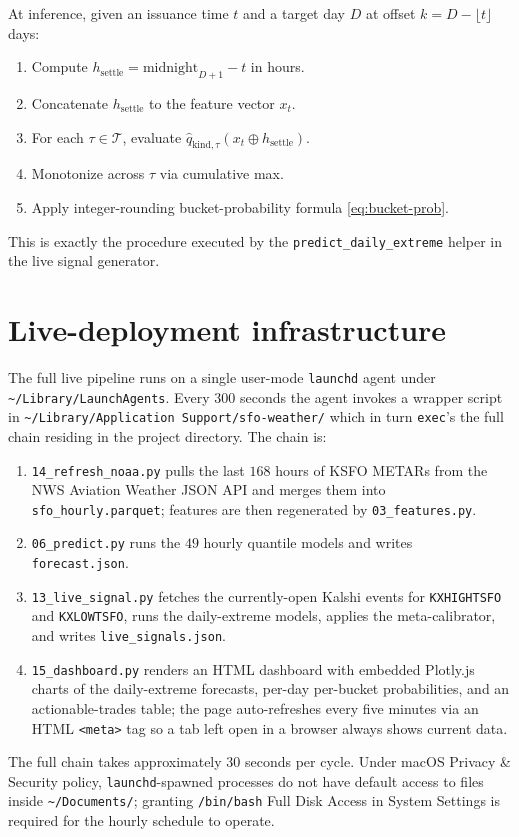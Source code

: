 \documentclass[11pt]{article}
\begin{document}
At inference, given an issuance time $t$ and a target day $D$ at offset
$k = D - \lfloor t \rfloor$ days:
\begin{enumerate}[leftmargin=*,topsep=2pt,itemsep=2pt]
\item Compute $h_\text{settle} = \text{midnight}_{D+1} - t$ in hours.
\item Concatenate $h_\text{settle}$ to the feature vector $x_t$.
\item For each $\tau \in \mathcal{T}$, evaluate $\hat{q}_{\text{kind}, \tau}(x_t \oplus h_\text{settle})$.
\item Monotonize across $\tau$ via cumulative max.
\item Apply integer-rounding bucket-probability formula \eqref{eq:bucket-prob}.
\end{enumerate}

This is exactly the procedure executed by the \texttt{predict\_daily\_extreme}
helper in the live signal generator.

\section{Live-deployment infrastructure}
\label{app:deploy}

The full live pipeline runs on a single user-mode \texttt{launchd} agent under
\texttt{\textasciitilde/Library/LaunchAgents}. Every $300$ seconds the agent
invokes a wrapper script in
\texttt{\textasciitilde/Library/Application Support/sfo-weather/} which in turn
\texttt{exec}'s the full chain residing in the project directory. The chain
is:
\begin{enumerate}[leftmargin=*,topsep=2pt,itemsep=2pt]
\item \texttt{14\_refresh\_noaa.py} pulls the last $168$ hours of KSFO METARs
from the NWS Aviation Weather JSON API and merges them into
\texttt{sfo\_hourly.parquet}; features are then regenerated by
\texttt{03\_features.py}.
\item \texttt{06\_predict.py} runs the $49$ hourly quantile models and writes
\texttt{forecast.json}.
\item \texttt{13\_live\_signal.py} fetches the currently-open Kalshi events for
\texttt{KXHIGHTSFO} and \texttt{KXLOWTSFO}, runs the daily-extreme models,
applies the meta-calibrator, and writes \texttt{live\_signals.json}.
\item \texttt{15\_dashboard.py} renders an HTML dashboard with embedded
Plotly.js charts of the daily-extreme forecasts, per-day per-bucket
probabilities, and an actionable-trades table; the page auto-refreshes every
five minutes via an HTML \texttt{<meta>} tag so a tab left open in a browser
always shows current data.
\end{enumerate}
The full chain takes approximately $30$ seconds per cycle. Under macOS
Privacy \& Security policy, \texttt{launchd}-spawned processes do not have
default access to files inside \texttt{\textasciitilde/Documents/}; granting
\texttt{/bin/bash} Full Disk Access in System Settings is required for the
hourly schedule to operate.
\end{document}
